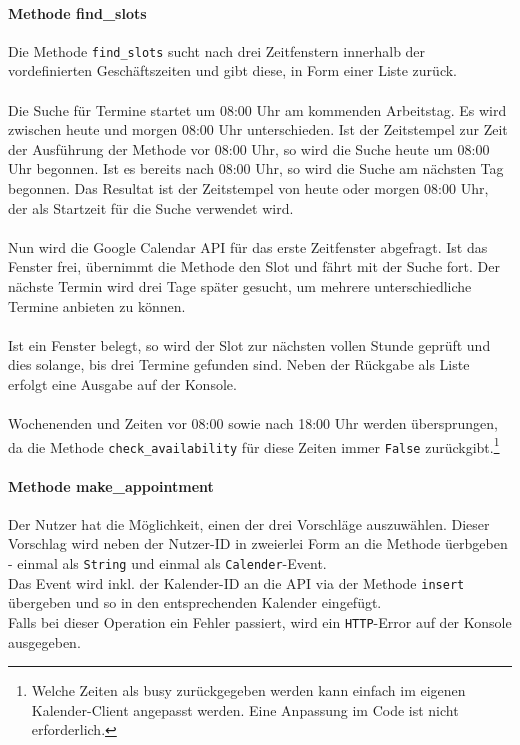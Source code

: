             \paragraph{Methode find\_slots}
                Die Methode \verb|find_slots| sucht nach drei Zeitfenstern innerhalb der vordefinierten Geschäftszeiten und gibt diese, in Form einer Liste zurück. \\
                \\
                Die Suche für Termine startet um 08:00 Uhr am kommenden Arbeitstag. Es wird zwischen heute und morgen 08:00 Uhr unterschieden. Ist der Zeitstempel zur Zeit der Ausführung der Methode vor 08:00 Uhr, so wird die Suche heute um 08:00 Uhr begonnen. Ist es bereits nach 08:00 Uhr, so wird die Suche am nächsten Tag begonnen. Das Resultat ist der Zeitstempel von heute oder morgen 08:00 Uhr, der als Startzeit für die Suche verwendet wird. \\
                \\
                Nun wird die Google Calendar API für das erste Zeitfenster abgefragt. Ist das Fenster frei, übernimmt die Methode den Slot und fährt mit der Suche fort. Der nächste Termin wird drei Tage später gesucht, um mehrere unterschiedliche Termine anbieten zu können. \\
                \\
                Ist ein Fenster belegt, so wird der Slot zur nächsten vollen Stunde geprüft und dies solange, bis drei Termine gefunden sind. Neben der Rückgabe als Liste erfolgt eine Ausgabe auf der Konsole.\\
                \\
                Wochenenden und Zeiten vor 08:00 sowie nach 18:00 Uhr werden übersprungen, da die Methode \verb|check_availability| für diese Zeiten immer \verb|False| zurückgibt.\footnote{Welche Zeiten als busy zurückgegeben werden kann einfach im eigenen Kalender-Client angepasst werden. Eine Anpassung im Code ist nicht erforderlich.}


            \paragraph{Methode make\_appointment}
                Der Nutzer hat die Möglichkeit, einen der drei Vorschläge auszuwählen. Dieser Vorschlag wird neben der Nutzer-ID in zweierlei Form an die Methode üerbgeben - einmal als \verb|String| und einmal als \verb|Calender|-Event. \\
                Das Event wird inkl. der Kalender-ID an die API via der Methode \verb|insert| übergeben und so in den entsprechenden Kalender eingefügt. \\
                Falls bei dieser Operation ein Fehler passiert, wird ein \verb|HTTP|-Error auf der Konsole ausgegeben.

